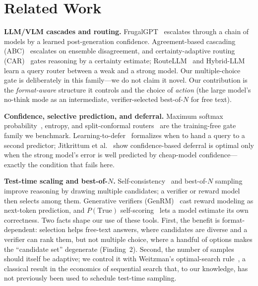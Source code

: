 \documentclass[conference]{IEEEtran}
\begin{document}
\section{Related Work}
\textbf{LLM/VLM cascades and routing.} FrugalGPT~\cite{frugalgpt} escalates through a chain of models by a learned post-generation confidence. Agreement-based cascading (ABC)~\cite{abc} escalates on ensemble disagreement, and certainty-adaptive routing (CAR)~\cite{car} gates reasoning by a certainty estimate; RouteLLM~\cite{routellm} and Hybrid-LLM~\cite{hybridllm} learn a query router between a weak and a strong model. Our multiple-choice gate is deliberately in this family---we do not claim it novel. Our contribution is the \emph{format-aware} structure it controls and the choice of \emph{action} (the large model's no-think mode as an intermediate, verifier-selected best-of-$N$ for free text).

\textbf{Confidence, selective prediction, and deferral.} Maximum softmax probability~\cite{chow,msp}, entropy, and split-conformal routers~\cite{cprouter} are the training-free gate family we benchmark. Learning-to-defer~\cite{mozannar,jitkrittum,l2dseq} formalizes when to hand a query to a second predictor; Jitkrittum et al.~\cite{jitkrittum} show confidence-based deferral is optimal only when the strong model's error is well predicted by cheap-model confidence---exactly the condition that fails here.

\textbf{Test-time scaling and best-of-$N$.} Self-consistency~\cite{selfconsistency} and best-of-$N$ sampling improve reasoning by drawing multiple candidates; a verifier or reward model then selects among them. Generative verifiers (GenRM)~\cite{genrm} cast reward modeling as next-token prediction, and $P(\text{True})$ self-scoring~\cite{kadavath} lets a model estimate its own correctness. Two facts shape our use of these tools. First, the benefit is format-dependent: selection helps free-text answers, where candidates are diverse and a verifier can rank them, but not multiple choice, where a handful of options makes the ``candidate set'' degenerate (Finding~2). Second, the number of samples should itself be adaptive; we control it with Weitzman's optimal-search rule~\cite{weitzman}, a classical result in the economics of sequential search that, to our knowledge, has not previously been used to schedule test-time sampling.
\end{document}
